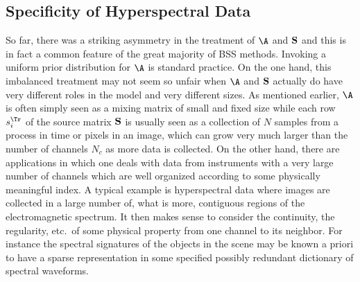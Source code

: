\subsection{Specificity of Hyperspectral Data}
So far, there was a striking asymmetry in the treatment of $\A$ and $\bf S$ and this is in fact a common feature of the great majority of BSS methods. Invoking a uniform prior distribution for $\A$ is standard practice. On the one hand, this imbalanced treatment may not seem so unfair when $\A$ and $\bf S$ actually do have very different roles in the model and very different sizes. As mentioned earlier, $\A$ is often simply seen as a mixing matrix of small and fixed size while each row $s_i^\Tr$ of the source matrix $\bf S$ is usually seen as a collection of $N$ samples from a process in time or pixels in an image, which can grow very much larger than the number of channels $N_c$ as more data is collected. On the other hand, there are applications in which one deals with data from instruments with a very large number of channels which are well organized according to some physically meaningful index. 
A typical example is hyperspectral data where images are collected in a large number of, what is more, contiguous regions of the electromagnetic spectrum.  
It then makes sense to consider the continuity, the regularity, etc.\ of some physical property from one channel to its neighbor. For instance the spectral signatures of the objects in the scene may be known a priori to have a sparse representation in some specified possibly redundant dictionary of spectral waveforms. 

